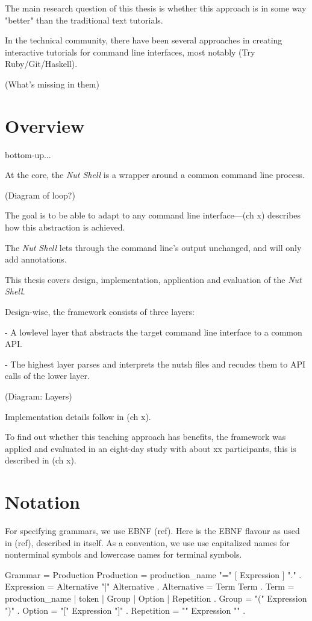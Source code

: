 \documentclass[paper=a4,twoside,abstract=on,cleardoublepage=empty,numbers=noenddot,toc=bib,12pt]{scrreprt}
\begin{document}
The main research question of this thesis is whether this approach is in some way "better" than the traditional text tutorials.

In the technical community, there have been several approaches in creating interactive tutorials for command line interfaces, most notably (Try Ruby/Git/Haskell).

(What's missing in them)

\section{Overview}

bottom-up...

At the core, the \emph{Nut Shell} is a wrapper around a common command line process.

(Diagram of loop?)

The goal is to be able to adapt to any command line interface---(ch x) describes how this abstraction is achieved.

The \emph{Nut Shell} lets through the command line's output unchanged, and will only add annotations.

This thesis covers design, implementation, application and evaluation of the \emph{Nut Shell}.

Design-wise, the framework consists of three layers:

- A lowlevel layer that abstracts the target command line interface to a common API.

- The highest layer parses and interprets the nutsh files and recudes them to API calls of the lower layer.

(Diagram: Layers)

Implementation details follow in (ch x).

To find out whether this teaching approach has benefits, the framework was applied and evaluated in an eight-day study with about xx participants, this is described in (ch x).

\section{Notation}
\label{sec:ebnf}

For specifying grammars, we use EBNF (ref). Here is the EBNF flavour as used in (ref), described in itself.
As a convention, we use use capitalized names for nonterminal symbols and lowercase names for terminal symbols.

\begin{ebnf}
Grammar     = { Production }
Production  = production_name "=" [ Expression ] "." .
Expression  = Alternative { "|" Alternative } .
Alternative = Term { Term } .
Term        = production_name | token | Group | Option | Repetition .
Group       = "(" Expression ")" .
Option      = "[" Expression "]" .
Repetition  = "{" Expression "}" .
\end{ebnf}
\end{document}
